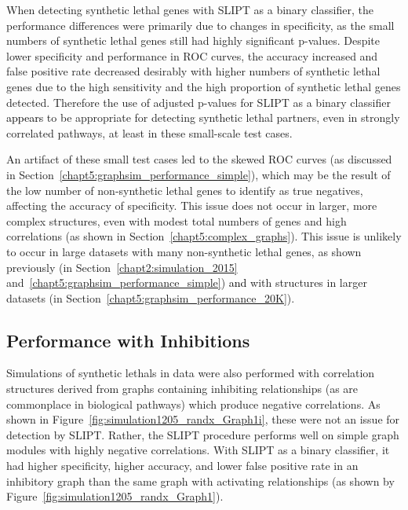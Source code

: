 When detecting \gls{synthetic lethal} genes with \gls{SLIPT} as a binary classifier, the performance differences were primarily due to changes in specificity, as the small numbers of \gls{synthetic lethal} genes still had highly significant p-values. Despite lower specificity and performance in \gls{ROC} curves, the accuracy increased and false positive rate decreased desirably with higher numbers of \gls{synthetic lethal} genes due to the high sensitivity and the high proportion of \gls{synthetic lethal} genes detected. Therefore the use of adjusted p-values for \gls{SLIPT} as a binary classifier \textcolor{black}{appears} to be appropriate for detecting \gls{synthetic lethal} partners, even in strongly correlated pathways, at least in these small-scale test cases.

An artifact of these small test cases led to the skewed \gls{ROC} curves (as discussed in Section~\ref{chapt5:graphsim_performance_simple}), which may be the result of the low number of non-synthetic lethal genes to identify as true negatives, affecting the accuracy of specificity. This issue does not occur in larger, more complex  structures, even with modest total numbers of genes and high correlations (as shown in Section~\ref{chapt5:complex_graphs}). This issue is unlikely to occur in large  datasets with many non-synthetic lethal genes, as shown previously (in Section~\ref{chapt2:simulation_2015} and~\ref{chapt5:graphsim_performance_simple}) \textcolor{black}{and} with  structures in larger datasets (in Section~\ref{chapt5:graphsim_performance_20K}). 



\subsection{Performance with Inhibitions}
\label{chapt5:graphsim_performance_inhib}


Simulations of \glspl{synthetic lethal} in  data were also performed with correlation structures derived from \glspl{graph} containing inhibiting relationships (as are commonplace in biological pathways) which produce negative correlations. As shown in Figure~\ref{fig:simulation1205_randx_Graph1i}, these were not an issue for detection by \gls{SLIPT}. Rather, the \gls{SLIPT} procedure performs well on simple graph modules with highly negative correlations. With \gls{SLIPT} as a binary classifier, it had higher specificity, higher accuracy, and lower false positive rate in an inhibitory graph than the same graph with activating relationships (as shown by Figure~\ref{fig:simulation1205_randx_Graph1}).

